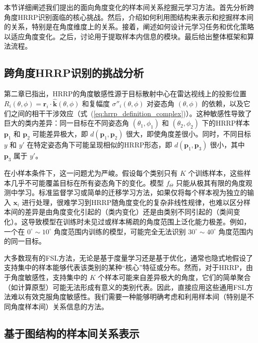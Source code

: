 本节详细阐述我们提出的面向角度变化的样本间关系挖掘元学习方法。首先分析跨角度HRRP识别面临的核心挑战。然后，介绍如何利用图结构来表示和挖掘样本间的关系，特别是在角度维度上的关系。接着，阐述如何设计元学习任务和优化策略以适应角度变化。之后，讨论用于提取样本内信息的模块。最后给出整体框架和算法流程。

\subsection{跨角度HRRP识别的挑战分析}
\label{subsec:angle_challenge_analysis}

第二章已指出，HRRP的角度敏感性源于目标散射中心在雷达视线上的投影位置 $R_i(\theta, \phi) = \mathbf{r}_i \cdot \hat{\mathbf{k}}(\theta, \phi)$ 和复幅度 $\sigma''_i(\theta, \phi)$ 对姿态角 $(\theta, \phi)$ 的依赖，以及它们之间的相干干涉效应（式~(\ref{eq:hrrp_definition_complex})）。这种敏感性导致了巨大的类内差异：同一目标在不同姿态角 $(\theta_1, \phi_1)$ 和 $(\theta_2, \phi_2)$ 下的HRRP样本 $\mathbf{p}_1$ 和 $\mathbf{p}_2$ 可能差异极大，即 $d(\mathbf{p}_1, \mathbf{p}_2)$ 很大，即使角度差很小。同时，不同目标 $y$ 和 $y'$ 在特定姿态角下可能呈现相似的HRRP形态，即 $d(\mathbf{p}_1, \mathbf{p}_3)$ 很小，其中 $\mathbf{p}_3$ 属于 $y'$。

在小样本条件下，这一问题尤为严峻。假设每个类别只有 $K$ 个训练样本，这些样本几乎不可能覆盖目标在所有姿态角下的变化。模型 $f_\Theta$ 只能从极其有限的角度观测中学习。标准监督学习或简单的迁移学习方法，如果仅将每个样本视为独立的输入 $\mathbf{x}_i$ 进行处理，很难学习到HRRP随角度变化的复杂非线性规律，也难以区分样本间的差异是由角度变化引起的（类内变化）还是由类别不同引起的（类间变化）。这导致模型在训练时未见过或样本稀疏的角度范围上泛化能力极差。例如，一个在 $0^\circ \sim 10^\circ$ 角度范围内训练的模型，可能完全无法识别 $30^\circ \sim 40^\circ$ 角度范围内的同一目标。

大多数现有的FSL方法，无论是基于度量学习还是基于优化，通常也隐式地假设了支持集中的样本能够代表该类别的某种“核心”特征或分布。然而，对于HRRP，由于角度敏感性，支持集中的 $K$ 个样本可能来自差异极大的角度，它们的简单聚合（如计算原型）可能无法形成有意义的类别代表。因此，直接应用这些通用FSL方法难以有效克服角度敏感性。我们需要一种能够明确考虑和利用样本间（特别是不同角度样本间）关系信息的方法。

\subsection{基于图结构的样本间关系表示}
\label{subsec:graph_relation_representation}


